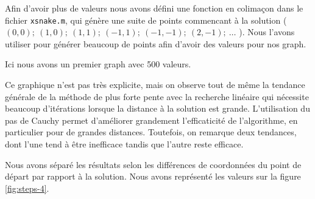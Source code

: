\documentclass[11pt,a4paper,twoside,onecolumn,titlepage]{report}
\begin{document}
\begin{enumerate}[(a)]
Afin d'avoir plus de valeurs nous avons défini une fonction en colimaçon dans le fichier \texttt{xsnake.m}, qui génère une suite de points commencant à la solution ( $(0,0);\ (1,0);\ (1,1);\ (-1,1);\ (-1,-1);\ (2,-1);\ \ldots$ ). Nous l'avons utiliser pour générer beaucoup de points afin d'avoir des valeurs pour nos graph.

Ici nous avons un premier graph avec 500 valeurs.

\noindent{}


Ce graphique n'est pas très explicite, mais on observe tout de même la tendance générale de la méthode de plus forte pente avec la recherche linéaire qui nécessite beaucoup d'itérations lorsque la distance à la solution est grande. L'utilisation du pas de Cauchy permet d'améliorer grandement l'efficaticité de l'algorithme, en particulier pour de grandes distances. Toutefois, on remarque deux tendances, dont l'une tend à être inefficace tandis que l'autre reste efficace.



Nous avons séparé les résultats selon les différences de coordonnées du point de départ par rapport à la solution. Nous avons représenté les valeurs sur la figure \ref{fig:steps-4}.


\end{enumerate}
\end{document}

